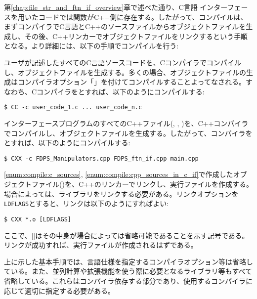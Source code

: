 第\ref{chap:file_str_and_ftn_if_overview}章で述べた通り、C言語 インターフェースを用いたコードでは関数がC++側に存在する。したがって、コンパイルは、まずコンパイラでC言語とC++のソースファイルからオブジェクトファイルを生成し、その後、C++リンカーでオブジェクトファイルをリンクするという手順となる。より詳細には、以下の手順でコンパイルを行う:
\begin{enumerate}[leftmargin=*,label={[\arabic*]}]
 ユーザが記述したすべてのC言語ソースコードを、Cコンパイラでコンパイルし、オブジェクトファイルを生成する。多くの場合、オブジェクトファイルの生成はコンパイラオプション「」を付けてコンパイルすることよってなされる。すなわち、Cコンパイラをとすれば、以下のようにコンパイルする:
\begin{Verbatim}[commandchars=\\\{\}]
$ CC -c user_code_1.c ... user_code_n.c
\end{Verbatim}
\label{enum:compile:c_sources}

 インターフェースプログラムのすべてのC++ファイル(, , )を、C++コンパイラでコンパイルし、オブジェクトファイルを生成する。したがって、コンパイラをとすれば、以下のようにコンパイルする:
\begin{Verbatim}[commandchars=\\\{\}]
$ CXX -c FDPS_Manipulators.cpp FDPS_ftn_if.cpp main.cpp
\end{Verbatim}
\label{enum:compile:cpp_sources_in_c_if}

 \ref{enum:compile:c_sources}, \ref{enum:compile:cpp_sources_in_c_if}で作成したオブジェクトファイル()を、C++のリンカーでリンクし、実行ファイルを作成する。場合によっては、ライブラリをリンクする必要がある。リンクオプションを\verb|LDFLAGS|とすると、リンクは以下のようにすればよい:
\begin{Verbatim}[commandchars=\\\{\}]
$ CXX *.o [LDFLAGS]
\end{Verbatim}
ここで、[]はその中身が場合によっては省略可能であることを示す記号である。
リンクが成功すれば、実行ファイルが作成されるはずである。
\end{enumerate}

上に示した基本手順では、言語仕様を指定するコンパイラオプション等は省略している。また、並列計算や拡張機能を使う際に必要となるライブラリ等もすべて省略している。これらはコンパイラ依存する部分であり、使用するコンパイラに応じて適切に指定する必要がある。


